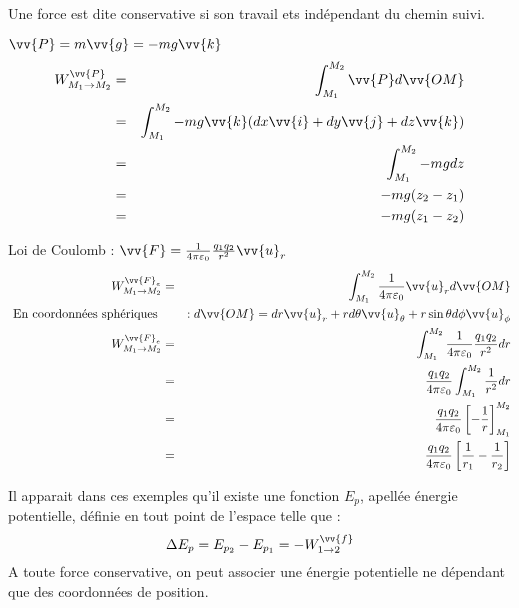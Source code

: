 \begin{definition}
    Une force est dite conservative si son travail ets indépendant du chemin suivi. 
    \begin{eg}[Le poids]
        \(\vv{P} = m\vv{g} = -mg\vv{k}\)
        \begin{eqnarray*}
            W^{\vv{P}}_{M_{1} \to M_{2}} &=& \int_{M_{1}}^{M_{2}} \vv{P}  d \vv{OM} \\
            &=& \int_{M_{1}}^{M_{2}} -mg\vv{k}  (dx \vv{i} + dy \vv{j} + dz \vv{k}) \\
            &=& \int_{M_{1}}^{M_{2}} -mg dz \\
            &=& -mg (z_{2}-z_{1}) \\
            &=& -mg (z_{1} - z_{2})
        \end{eqnarray*}
    \end{eg}

    \begin{eg}
        Loi de Coulomb : \(\vv{F} = \frac{1}{4 \pi \varepsilon_{\text{0}}} \frac{q_{1}q_{2}}{r^{2}} \vv{u}_{r}\)
        \begin{eqnarray*}
            W_{M_{1} \to M_{2}}^{\vv{F}_{e}} &=& \int_{M_{1}}^{M_{2}} \frac{1}{4 \pi \varepsilon_{\text{0}}} \vv{u}_{r} d \vv{OM} \\
            \text{ En coordonnées sphériques } && : d \vv{OM} = dr \vv{u}_{r} + rd \theta \vv{u}_{\theta} + r \sin \theta d \phi \vv{u}_{\phi} \\
            W_{M_{1} \to M_{2}}^{\vv{F}_{e}} &=& \int_{M_{1}}^{M_{2}} \frac{1}{4 \pi \varepsilon_{\text{0}}} \frac{q_{1}q_{2}}{r^{2}} dr \\
            &=& \frac{q_{1}q_{2}}{4 \pi \varepsilon_{\text{0}}} \int_{M_{1}}^{M_{2}} \frac{1}{r^{2}}  dr \\
            &=& \frac{q_{1}q_{2}}{4 \pi \varepsilon_{\text{0}}} \left[ -\frac{1}{r} \right]^{M_{2}}_{M_{1}} \\
            &=& \frac{q_{1}q_{2}}{4 \pi \varepsilon_{\text{0}}} \left[ \frac{1}{r_{1}} - \frac{1}{r_{2}} \right] \\
        \end{eqnarray*}
    \end{eg}
\end{definition}

\begin{definition}
    Il apparait dans ces exemples qu'il existe une fonction \(E_{p}\), apellée énergie potentielle, définie en tout point de l'espace telle que : 
    \[
        \Delta E_{p} = E_{p_{2}} - E_{p_{1}} = -W^{\vv{f}}_{1 \to 2} 
    \]
    A toute force conservative, on peut associer une énergie potentielle ne dépendant que des coordonnées de position.
\end{definition}

